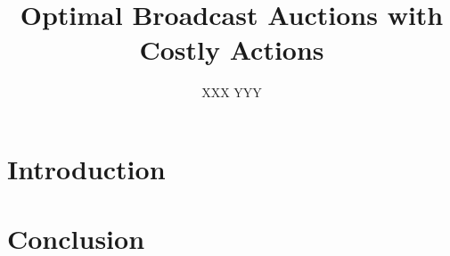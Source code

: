 \documentclass{aamas2012}
\begin{document}
\title{Optimal Broadcast Auctions with Costly Actions}


\author{ \alignauthor XXX \alignauthor YYY }


\maketitle

\section{Introduction}







\section{Conclusion}
\end{document}
